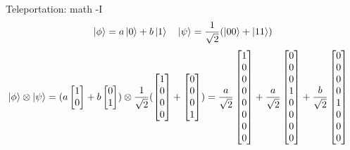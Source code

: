 \documentclass{beamer}
\begin{document}
\begin{frame}{Teleportation: math -I}
  {\tiny
    \begin{align*}
      \ket{\phi} = a \ket{0} + b\ket{1} \quad \ket{\psi} = \frac{1}{\sqrt{2}} (\ket{00} + \ket{11} ) \\
    \end{align*}
    \begin{align*}
      \ket{\phi} \otimes \ket{\psi} &=
      ( a \begin{bmatrix} 1 \\ 0 \end{bmatrix} + b \begin{bmatrix}  0 \\ 1 \end{bmatrix} )
      \otimes
      \frac{1}{\sqrt2}
      (
      \begin{bmatrix} 1 \\ 0 \\ 0 \\ 0 \end{bmatrix} 
      +
      \begin{bmatrix} 0 \\ 0 \\ 0 \\ 1 \end{bmatrix} 
      )
      =
      \frac{a}{\sqrt{2}} \begin{bmatrix} 1 \\ 0 \\ 0 \\ 0 \\ 0 \\ 0 \\ 0 \\ 0 \end{bmatrix} 
      +
      \frac{a}{\sqrt{2}} \begin{bmatrix} 0 \\ 0 \\ 0 \\ 1 \\ 0 \\ 0 \\ 0 \\ 0 \end{bmatrix} 
      +
      \frac{b}{\sqrt{2}} \begin{bmatrix} 0 \\ 0 \\ 0 \\ 0 \\ 1 \\ 0 \\ 0 \\ 0 \end{bmatrix} 

\end{align*}}
\end{frame}
\end{document}
